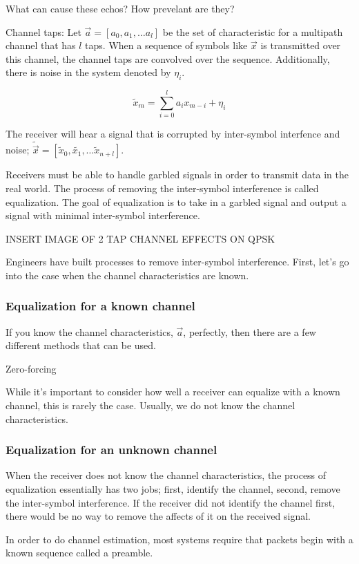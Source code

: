 What can cause these echos?  How prevelant are they?

Channel taps:
Let $\vec{a} = [a_0, a_1, \ldots a_l]$ be the set of characteristic for a multipath channel that has $l$ taps. When a sequence of symbols like $\vec{x}$ is transmitted over this channel, the channel taps are convolved over the sequence.  Additionally, there is noise in the system denoted by $\eta_i$. 

$$\tilde{x}_m = \sum_{i=0}^l a_i x_{m-i} + \eta_i$$

The receiver will hear a signal that is corrupted by inter-symbol interfence and noise;
$\tilde{\vec{x}}=[\tilde{x}_0, \tilde{x_1}, \ldots \tilde{x}_{n+l}]$. 

Receivers must be able to handle garbled signals in order to transmit data in the real world.  The process of removing the inter-symbol interference is called equalization.  The goal of equalization is to take in a garbled signal and output a signal with minimal inter-symbol interference. 

INSERT IMAGE OF 2 TAP CHANNEL EFFECTS ON QPSK

Engineers have built processes to remove inter-symbol interference.  First, let's go into the case when the channel characteristics are known.

\subsubsection{Equalization for a known channel}
If you know the channel characteristics, $\vec{a}$, perfectly, then there are a few different methods that can be used. 

Zero-forcing

While it's important to consider how well a receiver can equalize with a known channel, this is rarely the case.  Usually, we do not know the channel characteristics.

\subsubsection{Equalization for an unknown channel}
When the receiver does not know the channel characteristics, the process of equalization essentially has two jobs; first, identify the channel, second, remove the inter-symbol interference. If the receiver did not identify the channel first, there would be no way to remove the affects of it on the received signal. 

In order to do channel estimation, most systems require that packets begin with a known sequence called a preamble. 

